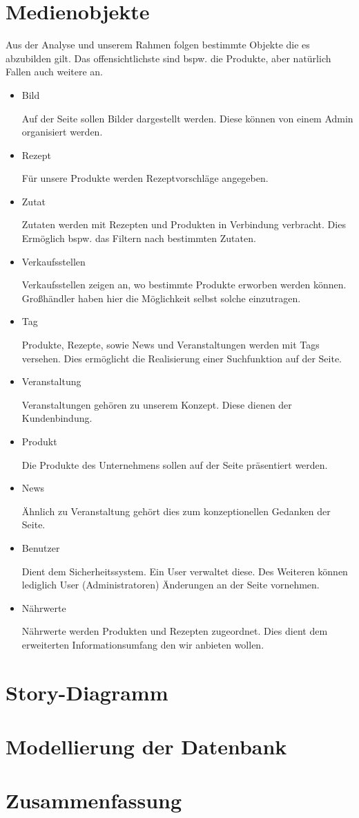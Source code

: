 \documentclass[12pt,a4paper,oneside,ngerman]{article}
\begin{document}
\section{Medienobjekte} %
Aus der Analyse und unserem Rahmen folgen bestimmte Objekte die es abzubilden gilt. Das offensichtlichste sind bspw. die Produkte, aber natürlich Fallen auch weitere an.
\begin{itemize}
\item Bild

Auf der Seite sollen Bilder dargestellt werden. Diese können von einem Admin organisiert werden.

\item Rezept

Für unsere Produkte werden Rezeptvorschläge angegeben.

\item Zutat

Zutaten werden mit Rezepten und Produkten in Verbindung verbracht. Dies Ermöglich bspw. das Filtern nach bestimmten Zutaten.

\item Verkaufsstellen

Verkaufsstellen zeigen an, wo bestimmte Produkte erworben werden können. Großhändler haben hier die Möglichkeit selbst solche einzutragen.

\item Tag

Produkte, Rezepte, sowie News und Veranstaltungen werden mit Tags versehen. Dies ermöglicht die Realisierung einer Suchfunktion auf der Seite.

\item Veranstaltung

Veranstaltungen gehören zu unserem Konzept. Diese dienen der Kundenbindung.

\item Produkt

Die Produkte des Unternehmens sollen auf der Seite präsentiert werden.

\item News

Ähnlich zu Veranstaltung gehört dies zum konzeptionellen Gedanken der Seite.

\item Benutzer

Dient dem Sicherheitssystem. Ein User verwaltet diese. Des Weiteren können lediglich User (Administratoren) Änderungen an der Seite vornehmen.

\item Nährwerte

Nährwerte werden Produkten und Rezepten zugeordnet. Dies dient dem erweiterten Informationsumfang den wir anbieten wollen.

\end{itemize}


\section{Story-Diagramm} %



\section{Modellierung der Datenbank} %

\section{Zusammenfassung} %
\end{document}
